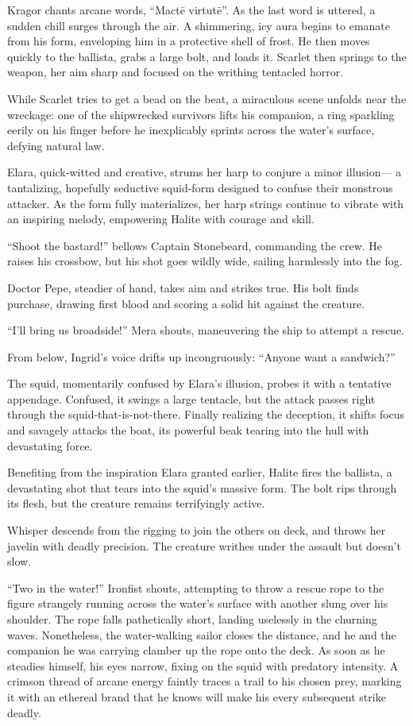\documentclass[
  letterpaper,12pt,twoside,twocolumn,openany,
  nodeprecatedcode,bg=full]{dndbook}
\begin{document}
Kragor chants arcane words, ``Mactē virtutē''. As the last word is
uttered, a sudden chill surges through the air. A shimmering, icy aura
begins to emanate from his form, enveloping him in a protective shell of
frost. He then moves quickly to the ballista, grabs a large bolt, and
loads it. Scarlet then springs to the weapon, her aim sharp and focused
on the writhing tentacled horror.

While Scarlet tries to get a bead on the beat, a miraculous scene
unfolds near the wreckage: one of the shipwrecked survivors lifts his
companion, a ring sparkling eerily on his finger before he inexplicably
sprints across the water's surface, defying natural law.

Elara, quick-witted and creative, strums her harp to conjure a minor
illusion--- a tantalizing, hopefully seductive squid-form designed to
confuse their monstrous attacker. As the form fully materializes, her
harp strings continue to vibrate with an inspiring melody, empowering
Halite with courage and skill.

``Shoot the bastard!'' bellows Captain Stonebeard, commanding the crew.
He raises his crossbow, but his shot goes wildly wide, sailing
harmlessly into the fog.

Doctor Pepe, steadier of hand, takes aim and strikes true. His bolt
finds purchase, drawing first blood and scoring a solid hit against the
creature.

``I'll bring us broadside!'' Mera shouts, maneuvering the ship to
attempt a rescue.

From below, Ingrid's voice drifts up incongruously: ``Anyone want a
sandwich?''

The squid, momentarily confused by Elara's illusion, probes it with a
tentative appendage. Confused, it swings a large tentacle, but the
attack passes right through the squid-that-is-not-there. Finally
realizing the deception, it shifts focus and savagely attacks the boat,
its powerful beak tearing into the hull with devastating force.

Benefiting from the inspiration Elara granted earlier, Halite fires the
ballista, a devastating shot that tears into the squid's massive form.
The bolt rips through its flesh, but the creature remains terrifyingly
active.

Whisper descends from the rigging to join the others on deck, and throws
her javelin with deadly precision. The creature writhes under the
assault but doesn't slow.

``Two in the water!'' Ironfist shouts, attempting to throw a rescue rope
to the figure strangely running across the water's surface with another
slung over his shoulder. The rope falls pathetically short, landing
uselessly in the churning waves. Nonetheless, the water-walking sailor
closes the distance, and he and the companion he was carrying clamber up
the rope onto the deck. As soon as he steadies himself, his eyes narrow,
fixing on the squid with predatory intensity. A crimson thread of arcane
energy faintly traces a trail to his chosen prey, marking it with an
ethereal brand that he knows will make his every subsequent strike
deadly.
\end{document}
